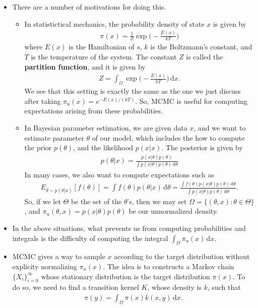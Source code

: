 \documentclass[10pt]{article}
\newcommand{\dee}{\mathrm{d}}
\begin{document}
\begin{itemize}
  \item There are a number of motivations for doing this.
  \begin{itemize}
    \item In statistictical mechanics, the probability density of state $ x$ is given by
    \begin{align*}
      \pi( x) = \frac{1}{Z} \exp\bigg(-\frac{E( x)}{kT}\bigg)
    \end{align*}
    where $E( x)$ is the Hamiltonian of $s$, $k$ is the Boltzmann's constant, and $T$ is the temperature of the system. The constant $Z$ is called the {\bf partition function}, and it is given by
    \begin{align*}
      Z = \int_{\Omega} \exp\bigg( -\frac{E( x)}{kT} \bigg)\, \dee  x.
    \end{align*}    
    We see that this setting is exactly the same as the one we just discuss after taking $\pi_u( x) = e^{-E( x)/(kT)}$. So, MCMC is useful for computing expectations arising from these probabilities.

    \item In Bayesian parameter estimation, we are given data $x$, and we want to estimate parameter $\theta$ of our model, which includes the how to compute the prior $p(\theta)$, and the likelihood $p( x|x)$. The posterior is given by
    \begin{align*}
      p(\theta | x) = \frac{p(x|\theta)p(\theta)}{\int p(x|\theta)p(\theta)\, \dee \theta}
    \end{align*}
    In many cases, we also want to compute expectations such as
    \begin{align*}
      E_{\theta \sim p(\theta|x)}[f(\theta)] 
      = \int f(\theta)p(\theta|x)\, \dee \theta
      = \frac{\int f(\theta)p(x|\theta)p(\theta)\, \dee\theta}{\int p(x|\theta)p(\theta)\, \dee \theta}.
    \end{align*}
    So, if we let $\Theta$ be the set of the $\theta$'s, then we may set $\Omega = \{ (\theta,x) : \theta \in \Theta \}$, and $\pi_u(\theta,x) = p(x|\theta)p(\theta)$ be our unnormalized density.
  \end{itemize}

  \item In the above situations, what prevents us from computing probabilities and integrals is the difficulty of computing the integral $\int_\Omega \pi_u( x)\, \dee x$.
  
  \item MCMC gives a way to sample $ x$ according to the target distribution without explicity normalizing $\pi_u( x)$. The idea is to constructs a Markov chain $\{ X_i \}_{i=0}^\infty$ whose stationary distribution is the target distribution $\pi(x)$. To do so, we need to find a transition kernel $K$, whose density is $k$, such that
  \begin{align*}
    \pi(y) = \int_\Omega \pi(x) k(x, y)\, \dee x.
  \end{align*}
  

\end{itemize}
\end{document}
